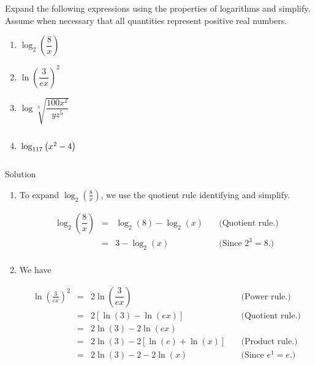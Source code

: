 \ifvc
\begin{example}  \label{expandlogex} Expand the following expressions using the properties of logarithms and simplify.  Assume when necessary that all quantities represent positive real numbers.

\begin{multicols}{2}
\begin{enumerate}

\item $\log_{2}\left(\dfrac{8}{x}\right)$ 


\item  $\ln \left(\dfrac{3}{ex}\right)^2$

\item  $\log \sqrt[3]{\dfrac{100 x^2}{yz^5}}$

\item  $\vphantom{\log \sqrt[3]{\dfrac{100 x^2}{yz^5}}} \log_{117}\left(x^2 - 4\right)$


\end{enumerate}
\end{multicols}

Solution 

\begin{enumerate}


\item  To expand $\log_{2}\left(\frac{8}{x}\right)$, we use the quotient rule identifying and simplify.

\setlength{\extrarowheight}{6pt}
\[ \begin{array}{rclr}

\log_{2}\left(\dfrac{8}{x}\right) & = &  \log_{2}(8) - \log_{2}(x) & \quad\mbox{(Quotient rule.)} \\

& = &  3 - \log_{2}(x) & \quad\mbox{(Since $2^{3} = 8$.)} \\

\end{array}\]

\setlength{\extrarowheight}{2pt}

\item  We have 

\setlength{\extrarowheight}{6pt}
\[ \begin{array}{rclr}

\ln \left(\frac{3}{ex}\right)^2 & = & 2 \ln \left(\dfrac{3}{ex}\right) & \quad\mbox{(Power rule.)} \\
                                 & = & 2 \left[ \ln(3) - \ln(ex) \right] & \quad\mbox{(Quotient rule.)} \\
                                 & = & 2 \ln(3) - 2\ln(ex) & \\
                                 & = & 2 \ln(3) - 2\left[\ln(e) + \ln(x)\right] & \quad\mbox{(Product rule.)} \\
                                 & = & 2\ln(3) - 2 - 2 \ln(x) & \quad\mbox{(Since $e^{1} = e$.)} \\
\end{array}\]
\setlength{\extrarowheight}{2pt}
                        


\end{enumerate}
\end{example}

